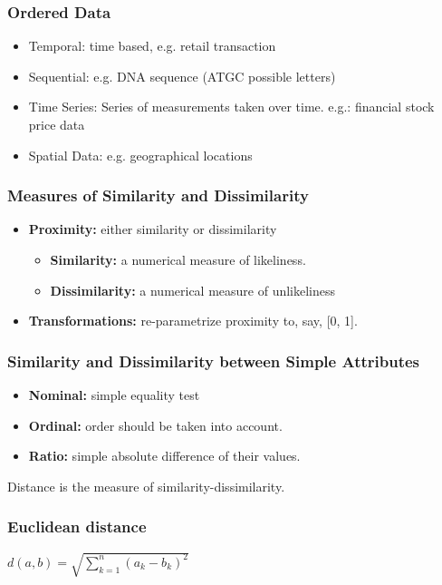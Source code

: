\begin{frame}[fragile]\frametitle{Ordered Data}	

\begin{itemize}
\item Temporal: time based, e.g. retail transaction
\item Sequential: e.g. DNA sequence (ATGC possible letters)
\item Time Series: Series of measurements taken over time. e.g.: financial stock price data
\item Spatial Data: e.g. geographical locations
\end{itemize}
\end{frame}

\begin{frame}[fragile]\frametitle{Measures of Similarity and Dissimilarity}

	\begin{itemize}
		\item {\bf Proximity:} either similarity or dissimilarity
			\begin{itemize}
		\item {\bf Similarity:} a numerical measure of likeliness.
		\item{\bf Dissimilarity:} a numerical measure of unlikeliness
		\end{itemize}
		\item {\bf Transformations:} re-parametrize proximity to, say, [0, 1].
\end{itemize}
\end{frame}

\begin{frame}[fragile]\frametitle{Similarity and Dissimilarity between Simple Attributes}

		\begin{itemize}
			\item{\bf Nominal:} simple equality test
			\item{\bf Ordinal:} order should be taken into account.
			\item{\bf Ratio:} simple absolute difference of their values.
\end{itemize}
Distance is the measure of similarity-dissimilarity.
\end{frame}

\begin{frame}[fragile]\frametitle{Euclidean distance} 
$d(a,b) = \sqrt{\sum_{k=1}^{n} (a_k - b_k)^{2}}$
\end{frame}

